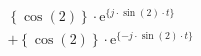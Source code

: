 \[
\begin{split}
&  \left \{ \cos(2) \right \} \cdot \textrm{e}^{\{  j \cdot \sin(2) \cdot t \}}\\
&+ \left \{ \cos(2) \right \} \cdot \textrm{e}^{\{- j \cdot \sin(2) \cdot t \}}
\end{split}
\]

